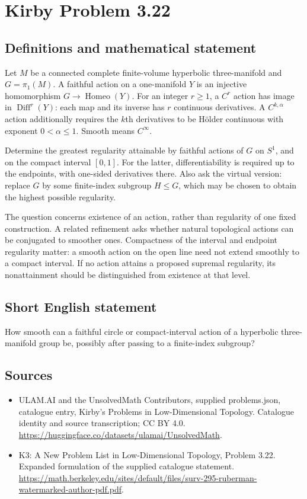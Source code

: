 \documentclass[11pt,a4paper]{article}
\begin{document}
\section*{Kirby Problem 3.22}\label{statement}

\subsection{Definitions and mathematical statement}
Let $M$ be a connected complete finite-volume hyperbolic three-manifold and
$G=\pi_1(M)$. A faithful action on a one-manifold $Y$ is an injective
homomorphism $G\to\operatorname{Homeo}(Y)$. For an integer $r\geq1$,
a $C^r$ action has image in $\operatorname{Diff}^r(Y)$: each map and its
inverse has $r$ continuous derivatives. A $C^{k,\alpha}$ action additionally
requires the $k$th derivatives to be Hölder continuous with exponent
$0<\alpha\leq1$. Smooth means $C^\infty$.

Determine the greatest regularity attainable by faithful actions of $G$ on
$S^1$, and on the compact interval $[0,1]$. For the latter, differentiability
is required up to the endpoints, with one-sided derivatives there. Also
ask the virtual version: replace $G$ by some finite-index subgroup $H\leq G$,
which may be chosen to obtain the highest possible regularity.

The question concerns existence of an action, rather than regularity of one
fixed construction. A related refinement asks whether natural topological
actions can be conjugated to smoother ones. Compactness of the interval and
endpoint regularity matter: a smooth action on the open line need not extend
smoothly to a compact interval. If no action attains a proposed supremal
regularity, its nonattainment should be distinguished from existence at that level.
\subsection{Short English statement}
How smooth can a faithful circle or compact-interval action of a hyperbolic three-manifold group be, possibly after passing to a finite-index subgroup?
\subsection{Sources}
\begin{itemize}
\item[S1] ULAM.AI and the UnsolvedMath Contributors, supplied problems.json, catalogue entry, Kirby's Problems in Low-Dimensional Topology. Catalogue identity and source transcription; CC BY 4.0.
\url{https://huggingface.co/datasets/ulamai/UnsolvedMath}.
\item[S2] K3: A New Problem List in Low-Dimensional Topology, Problem 3.22. Expanded formulation of the supplied catalogue statement.
\url{https://math.berkeley.edu/sites/default/files/surv-295-ruberman-watermarked-author-pdf.pdf}.
\end{itemize}
\end{document}
